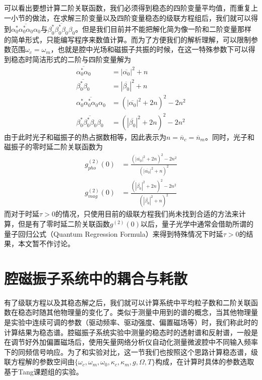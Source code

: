 可以看出要想计算二阶关联函数，我们必须得到稳态的四阶变量平均值，而重复上一小节的做法，在求解三阶变量以及四阶变量稳态的级联方程组后，我们就可以得到$\overline{\alpha_{0}^{*}\alpha_{0}^{*}\alpha_{0}\alpha_{0}}$与$\overline{\beta_{0}^{*}\beta_{0}^{*}\beta_{0}\beta_{0}}$。但是我们目前并不能把解化简为像一阶和二阶变量那样的简单形式，只能编写程序来数值计算。而为了方便我们的解析理解，可以限制参数范围$\omega_{c}=\omega_{m}$，也就是腔中光场和磁振子共振的时候，在这一特殊参数下可以得到稳态时简洁形式的二阶与四阶变量解为
\begin{align}
\overline{\alpha_{0}^{*}\alpha_{0}}&=|\overline{\alpha_{0}}|^{2}+n \\
\overline{\beta_{0}^{*}\beta_{0}}&=|\overline{\beta_{0}}|^{2}+n \\
\overline{\alpha_{0}^{*}\alpha_{0}^{*}\alpha_{0}\alpha_{0}}&=(|\overline{\alpha_{0}}|^{2}+2n)^2-2n^2 \\
\overline{\beta_{0}^{*}\beta_{0}^{*}\beta_{0}\beta_{0}}&=(|\overline{\beta_{0}}|^{2}+2n)^2-2n^2
\end{align}
由于此时光子和磁振子的热占据数相等，因此表示为$n=\overline{n}_{c}=\overline{n}_{m}$。同时，光子和磁振子的零时延二阶关联函数为
\begin{align}
g_{pho}^{(2)}(0) &  =\frac{(|\overline{\alpha_{0}}|^{2}+2n)^2-2n^2}{(|\overline{\alpha_{0}}|^{2}+n)^2} \label{g2pho} \\
g_{mag}^{(2)}(0) &  =\frac{(|\overline{\beta_{0}}|^{2}+2n)^2-2n^2}{(|\overline{\beta_{0}}|^{2}+n)^2} \label{g2mag}
\end{align}
而对于时延$\tau>0$的情况，只使用目前的级联方程我们尚未找到合适的方法来计算，但是有了零时延二阶关联函数$g^{(2)}(0)$以后，量子光学中通常会借助所谓的量子回归公式（Quantum Regression Formula）来得到特殊情况下时延$\tau>0$的结果\cite{carmichael1999statistical}，本文暂不作讨论\ChangeNotation。

\newlength{\basefigurewidth}
\setlength{\basefigurewidth}{0.33\textwidth}

\section{腔磁振子系统中的耦合与耗散}
有了级联方程以及其稳态解之后，我们就可以计算系统中平均粒子数和二阶关联函数在稳态时随其他物理量的变化了。类似于测量中用到的谱的概念，当其他物理量是实验中连续可调的参数（驱动频率、驱动强度、偏置磁场等）时，我们称此时的计算结果为稳态谱\ChangeNotation。腔磁振子系统实验中测量的稳态时的透射谱和反射谱，一般是在调节好外加偏置磁场后，使用矢量网络分析仪自动化测量微波腔中不同输入频率下的同频信号响应\cite{PhysRevB.99.134445Hu}。为了和实验对比，这一节我们也按照这个思路计算稳态谱，级联方程解的参数空间由$\{ \omega_c,\omega_m,\omega_0,\kappa_c,\kappa_m,g,\Omega,T \}$构成，在计算时具体的参数选取基于Tang课题组的实验\cite{PhysRevLett.113.156401Tang}。

